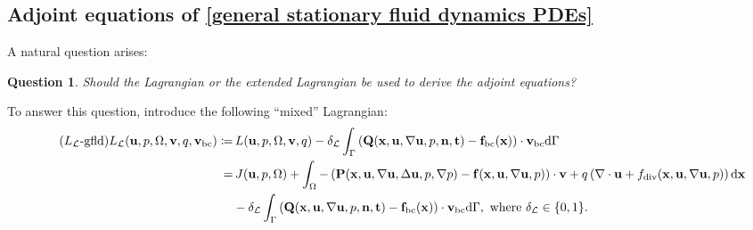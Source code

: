 \documentclass[oneside]{book}
\numberwithin{equation}{section}
\newtheorem{question}{Question}[section]
\begin{document}
\subsection{Adjoint equations of \eqref{general stationary fluid dynamics PDEs}}
A natural question arises:
\begin{question}
    Should the Lagrangian or the extended Lagrangian be used to derive the adjoint equations?
\end{question}
To answer this question, introduce the following ``mixed'' Lagrangian:
\begin{align}
    \label{mixed Lagrangian for general stationary fluid dynamics PDEs}
    \tag{$L_{\mathcal{L}}$-gfld}
    L_{\mathcal{L}}({\bf u},p,\Omega,{\bf v},q,{\bf v}_{\rm bc})\coloneqq&\, L({\bf u},p,\Omega,{\bf v},q)
    - \delta_{\mathcal{L}}\int_\Gamma \left({\bf Q}({\bf x},{\bf u},\nabla{\bf u},p,{\bf n},{\bf t}) - {\bf f}_{\rm bc}({\bf x})\right)\cdot{\bf v}_{\rm bc}{\rm d}\Gamma\\
    =&\, J({\bf u},p,\Omega) + \int_\Omega -\left({\bf P}({\bf x},{\bf u},\nabla{\bf u},\Delta{\bf u},p,\nabla p) - {\bf f}({\bf x},{\bf u},\nabla{\bf u},p)\right)\cdot{\bf v} + q\left(\nabla\cdot{\bf u} + f_{\rm div}({\bf x},{\bf u},\nabla{\bf u},p)\right){\rm d}{\bf x}\nonumber\\
    &- \delta_{\mathcal{L}}\int_\Gamma \left({\bf Q}({\bf x},{\bf u},\nabla{\bf u},p,{\bf n},{\bf t}) - {\bf f}_{\rm bc}({\bf x})\right)\cdot{\bf v}_{\rm bc}{\rm d}\Gamma, \mbox{ where } \delta_{\mathcal{L}}\in\{0,1\}\nonumber.
\end{align}
\end{document}
